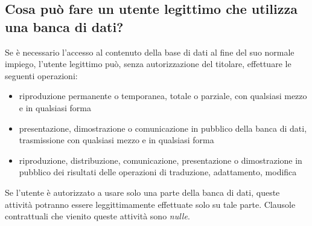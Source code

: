 \subsection{Cosa può fare un utente legittimo che utilizza una banca di dati?}
Se è necessario l'accesso al contenuto della base di dati al fine del suo normale impiego, l'utente legittimo
può, senza autorizzazione del titolare, effettuare le seguenti operazioni:
\begin{itemize}
    \item riproduzione permanente o temporanea, totale o parziale, con qualsiasi mezzo e in qualsiasi forma
    \item presentazione, dimostrazione o comunicazione in pubblico della banca di dati, trasmissione con qualsiasi mezzo
    e in qualsiasi forma
    \item riproduzione, distribuzione, comunicazione, presentazione o dimostrazione in pubblico dei risultati
    delle operazioni di traduzione, adattamento, modifica
\end{itemize}
Se l'utente è autorizzato a usare solo una parte della banca di dati, queste attività potranno essere leggittimamente effettuate
solo su tale parte. \newline
Clausole contrattuali che vienito queste attività sono \emph{nulle}.

